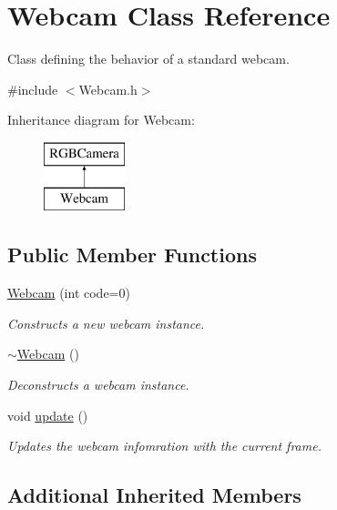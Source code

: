 \hypertarget{class_webcam}{}\section{Webcam Class Reference}
\label{class_webcam}


Class defining the behavior of a standard webcam.  




{\ttfamily \#include $<$Webcam.\+h$>$}

Inheritance diagram for Webcam\+:\begin{figure}[H]
\begin{center}
\leavevmode
\includegraphics[height=2.000000cm]{class_webcam}
\end{center}
\end{figure}
\subsection*{Public Member Functions}
\begin{DoxyCompactItemize}
\item 
\hyperlink{class_webcam_ae3694760a88e8975940045ec8d4c27ed}{Webcam} (int code=0)
\begin{DoxyCompactList}\small\item\em Constructs a new webcam instance. \end{DoxyCompactList}\item 
\hyperlink{class_webcam_a573d188c6505287dadb895b1ee7526b9}{$\sim$\+Webcam} ()
\begin{DoxyCompactList}\small\item\em Deconstructs a webcam instance. \end{DoxyCompactList}\item 
void \hyperlink{class_webcam_a3d5cab0a2b87b90b85793bc05414e503}{update} ()
\begin{DoxyCompactList}\small\item\em Updates the webcam infomration with the current frame. \end{DoxyCompactList}\end{DoxyCompactItemize}
\subsection*{Additional Inherited Members}


